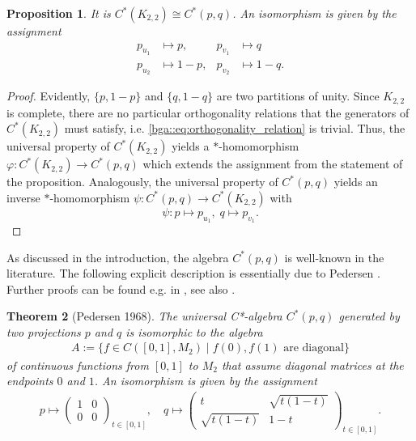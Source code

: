 \documentclass[a4paper]{amsart}
\newtheorem{thm}{Theorem}[section]
\newtheorem{proposition}[thm]{Proposition}
\begin{document}
\begin{proposition}
    \label{reps::prop:C*K22_is_C*pq}
    It is $C^\ast(K_{2,2}) \cong C^\ast(p,q)$. An isomorphism is given by the assignment
    \begin{align*}
        p_{u_1} &\mapsto p, &p_{v_1} &\mapsto q \\
        p_{u_2} &\mapsto 1-p, &p_{v_2} &\mapsto 1-q.
    \end{align*}
\end{proposition}

\begin{proof}
    Evidently, $\{p,1-p\}$ and $\{q, 1-q\}$ are two partitions of unity. 
    Since $K_{2,2}$ is complete, there are no particular orthogonality relations that the generators of $C^\ast(K_{2,2})$ must satisfy, i.e. \eqref{bga::eq:orthogonality_relation} is trivial. 
    Thus, the universal property of $C^\ast(K_{2,2})$ yields a $\ast$-homomorphism $\varphi: C^\ast(K_{2,2}) \to C^\ast(p,q)$ which extends the assignment from the statement of the proposition. 
    Analogously, the universal property of $C^\ast(p,q)$ yields an inverse $\ast$-homomorphism $\psi: C^\ast(p,q) \to C^\ast(K_{2,2})$ with 
    $$
    \psi: p \mapsto p_{u_1}, \; q \mapsto p_{v_1}.
    $$
\end{proof}

As discussed in the introduction, the algebra $C^\ast(p,q)$ is well-known in the literature. The following explicit description is essentially due to Pedersen \cite{pedersen_measure_1968}. Further proofs can be found e.g. in \cite{power_hankel_1982, roch_algebras_1988,raeburn_c-algebra_1989}, see also \cite{bottcher_gentle_2010}.

\begin{thm}[Pedersen 1968]
    \label{reps::thm:C*pq_as_continuous_functions}
    The universal C*-algebra $C^\ast(p,q)$ generated by two projections $p$ and $q$ is isomorphic to the algebra 
    \begin{align*}
        A := \{f \in C([0,1], M_2) \mid f(0), f(1) \text{ are diagonal} \}
    \end{align*}
    of continuous functions from $[0,1]$ to $M_2$ that assume diagonal matrices at the endpoints $0$ and $1$. An isomorphism is given by the assignment
    \begin{align*}
        p \mapsto \begin{pmatrix}
            1 & 0 \\
            0 & 0
        \end{pmatrix}_{t \in [0,1]}, 
        \quad
        q \mapsto \begin{pmatrix}
            t & \sqrt{t(1-t)} \\
            \sqrt{t(1-t)} & 1-t
        \end{pmatrix}_{t \in [0,1]}.
    \end{align*}
\end{thm}
\end{document}
